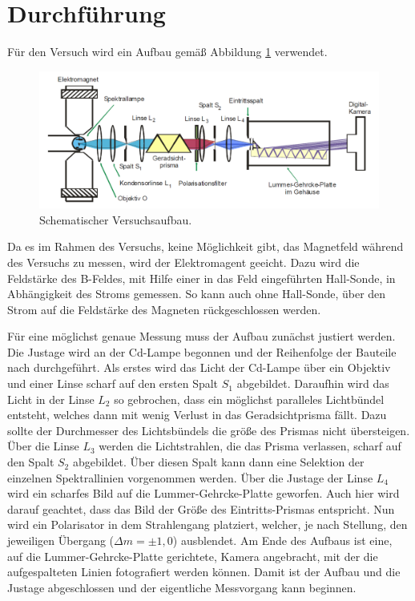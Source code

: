 \section{Durchführung}
\label{sec:Durchführung}


Für den Versuch wird ein Aufbau gemäß Abbildung \ref{fig:aufbau} verwendet.

\begin{figure}
    \centering
    \includegraphics[width=\textwidth]{Bilder/Aufbau.PNG}
    \caption{Schematischer Versuchsaufbau.}
    \label{fig:aufbau}
\end{figure}

Da es im Rahmen des Versuchs, keine Möglichkeit gibt, das Magnetfeld während des Versuchs zu messen, wird der Elektromagent geeicht. Dazu wird die Feldstärke des B-Feldes, mit Hilfe einer in das Feld eingeführten Hall-Sonde, in Abhängigkeit des Stroms gemessen. So kann auch ohne Hall-Sonde, über den Strom auf die Feldstärke des Magneten rückgeschlossen werden.



Für eine möglichst genaue Messung muss der Aufbau zunächst justiert werden. Die Justage wird an der Cd-Lampe begonnen und der Reihenfolge der Bauteile nach durchgeführt. 
Als erstes wird das Licht der Cd-Lampe über ein Objektiv und einer Linse scharf auf den ersten Spalt $S_1$ abgebildet.
Daraufhin wird das Licht in der Linse $L_2$ so gebrochen, dass ein möglichst paralleles Lichtbündel entsteht, welches dann mit wenig Verlust in das Geradsichtprisma fällt. Dazu sollte der Durchmesser des Lichtsbündels die größe des Prismas nicht übersteigen. 
Über die Linse $L_3$ werden die Lichtstrahlen, die das Prisma verlassen, scharf auf den Spalt $S_2$ abgebildet. Über diesen Spalt kann dann eine Selektion der einzelnen Spektrallinien vorgenommen werden. Über die Justage der Linse $L_4$ wird ein scharfes Bild auf die Lummer-Gehrcke-Platte geworfen. Auch hier wird darauf geachtet, dass das Bild der Größe des Eintritts-Prismas entspricht. 
Nun wird ein Polarisator in dem Strahlengang platziert, welcher, je nach Stellung, den jeweiligen Übergang ($\Delta m = \pm1,0$) ausblendet.
Am Ende des Aufbaus ist eine, auf die Lummer-Gehrcke-Platte gerichtete, Kamera angebracht, mit der die aufgespalteten Linien fotografiert werden können. Damit ist der Aufbau und die Justage abgeschlossen und der eigentliche Messvorgang kann beginnen. 



